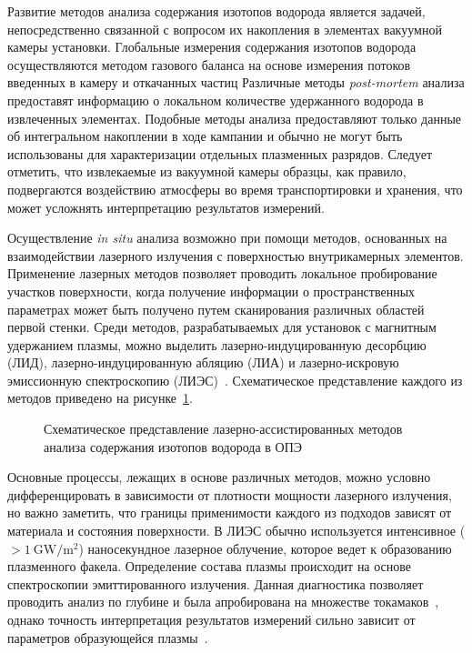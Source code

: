 Развитие методов анализа содержания изотопов водорода является задачей, непосредственно связанной с вопросом их накопления в элементах вакуумной камеры установки. Глобальные измерения содержания изотопов водорода осуществляются методом газового баланса на основе измерения потоков введенных в камеру и откачанных частиц Различные методы \textit{post-mortem} анализа предоставят информацию о локальном количестве удержанного водорода в извлеченных элементах. Подобные методы анализа предоставляют только данные об интегральном накоплении в ходе кампании и обычно не могут быть использованы для характеризации отдельных плазменных разрядов. Следует отметить, что извлекаемые из вакуумной камеры образцы, как правило, подвергаются воздействию атмосферы во время транспортировки и хранения, что может усложнять интерпретацию результатов измерений.

Осуществление \textit{in situ} анализа возможно при помощи методов, основанных на взаимодействии лазерного излучения с поверхностью внутрикамерных элементов. Применение лазерных методов позволяет проводить локальное пробирование участков поверхности, когда получение информации о пространственных параметрах может быть получено путем сканирования различных областей первой стенки. Среди методов, разрабатываемых для установок с магнитным удержанием плазмы, можно выделить лазерно-индуцированную десорбцию (ЛИД), лазерно-индуцированную абляцию (ЛИА) и лазерно-искровую эмиссионную спектроскопию (ЛИЭС)~\cite{Philipps2013,Mukhin2016}. Схематическое представление каждого из методов приведено на рисунке~\cref{fig:ch1/laser_methods}.

\begin{figure}[ht]
    \caption{Схематическое представление лазерно-ассистированных методов анализа содержания изотопов водорода в ОПЭ}\label{fig:ch1/laser_methods}
\end{figure}

Основные процессы, лежащих в основе различных методов, можно условно дифференцировать в зависимости от плотности мощности лазерного излучения, но важно заметить, что границы применимости каждого из подходов зависят от материала и состояния поверхности. В ЛИЭС обычно используется интенсивное (\( >\SI{1}{\giga\watt\per\meter\squared} \)) наносекундное лазерное облучение, которое ведет к образованию плазменного факела. Определение состава плазмы происходит на основе спектроскопии эмиттированного излучения. Данная диагностика позволяет проводить анализ по глубине и была апробирована на множестве токамаков~\cite{Xiao2015,Semerok2016,Imran2023,Favre2024}, однако точность интерпретация результатов измерений сильно зависит от параметров образующейся плазмы~\cite{Marenkov2021}. 

